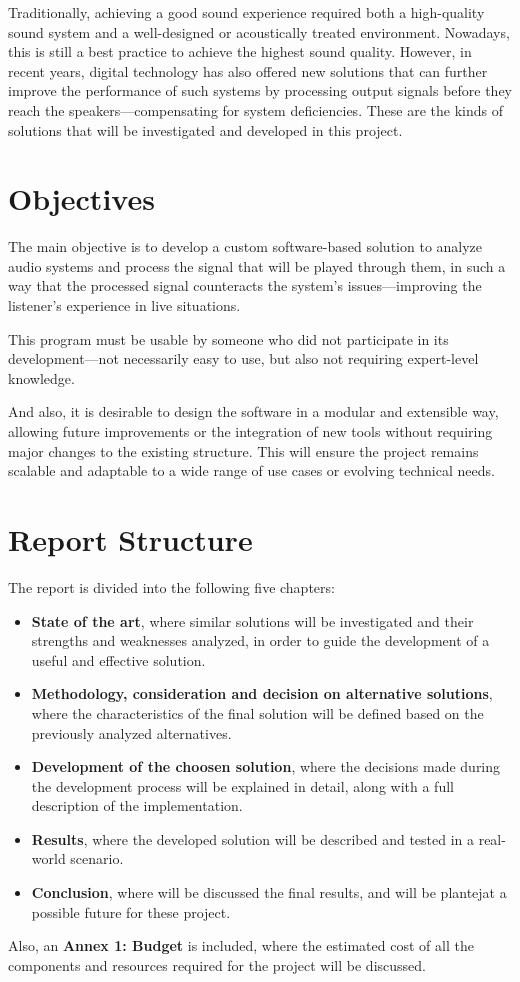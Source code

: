 Traditionally, achieving a good sound experience required both a high-quality sound system and a well-designed or acoustically treated environment. Nowadays, this is still a best practice to achieve the highest sound quality. However, in recent years, digital technology has also offered new solutions that can further improve the performance of such systems by processing output signals before they reach the speakers—compensating for system deficiencies. These are the kinds of solutions that will be investigated and developed in this project.


\section{Objectives}

The main objective is to develop a custom software-based solution to analyze audio systems and process the signal that will be played through them, in such a way that the processed signal counteracts the system’s issues—improving the listener’s experience in live situations.

This program must be usable by someone who did not participate in its development—not necessarily easy to use, but also not requiring expert-level knowledge.

And also, it is desirable to design the software in a modular and extensible way, allowing future improvements or the integration of new tools without requiring major changes to the existing structure. This will ensure the project remains scalable and adaptable to a wide range of use cases or evolving technical needs.

\section{Report Structure}

The report is divided into the following five chapters:

\begin{itemize}
	\item \textbf{State of the art}, where similar solutions will be investigated and their strengths and weaknesses analyzed, in order to guide the development of a useful and effective solution.
	
	\item \textbf{Methodology, consideration and decision on alternative solutions}, where the characteristics of the final solution will be defined based on the previously analyzed alternatives.
	
	\item \textbf{Development of the choosen solution}, where the decisions made during the development process will be explained in detail, along with a full description of the implementation.
	
	\item \textbf{Results}, where the developed solution will be described and tested in a real-world scenario.
	
	\item \textbf{Conclusion}, where will be discussed the final results, and will be plantejat a possible future for these project.
\end{itemize}

Also, an \textbf{Annex 1: Budget} is included, where the estimated cost of all the components and resources required for the project will be discussed.

